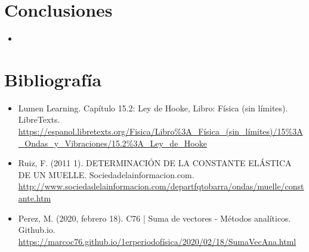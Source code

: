 \documentclass[10pt]{article}
\begin{document}
\section{Conclusiones}
\begin{itemize}
    \item
\end{itemize}

\section{Bibliografía}
\begin{itemize}
\item Lumen Learning. Capítulo 15.2: Ley de Hooke, Libro: Física (sin límites). LibreTexts.\\ \url{https://espanol.libretexts.org/Fisica/Libro\%3A_Física_(sin_límites)/15\%3A_Ondas_y_Vibraciones/15.2\%3A_Ley_de_Hooke}
\item Ruiz, F. (2011 1). DETERMINACIÓN DE LA CONSTANTE ELÁSTICA DE UN MUELLE. Sociedadelainformacion.com. \url{http://www.sociedadelainformacion.com/departfqtobarra/ondas/muelle/constante.htm}

\item Perez, M. (2020, febrero 18). C76 | Suma de vectores - Métodos analíticos. Github.io. \url{https://marcoc76.github.io/1erperiodofísica/2020/02/18/SumaVecAna.html}

\end{itemize}
\end{document}

